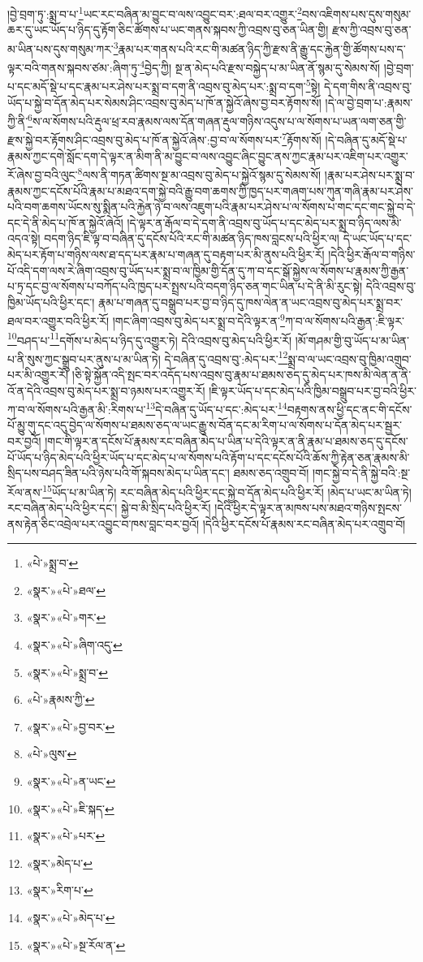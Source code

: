 །བྱེ་བྲག་ཏུ་:སྨྲ་བ་པ་\footnote{«པེ་»སྨྲ་བ་}ཡང་རང་བཞིན་མ་བྱུང་བ་ལས་འབྱུང་བར་:ཐལ་བར་འགྱུར་\footnote{«སྣར་»«པེ་»ཐལ་}བས་འཇིགས་པས་དུས་གསུམ་ཆར་དུ་ཡང་ཡོད་པ་ཉིད་དུ་རྟོག་ཅིང་ཚོགས་པ་ཡང་གནས་སྐབས་ཀྱི་འབྲས་བུ་ཅན་ཡིན་གྱི། རྫས་ཀྱི་འབྲས་བུ་ཅན་མ་ཡིན་པས་དུས་གསུམ་ཀར་\footnote{«སྣར་»«པེ་»གར་}རྣམ་པར་གནས་པའི་རང་གི་མཚན་ཉིད་ཀྱི་རྫས་ནི་རྒྱུ་དང་རྐྱེན་གྱི་ཚོགས་པས་ད་ལྟར་བའི་གནས་སྐབས་ཙམ་:ཞིག་ཏུ་\footnote{«སྣར་»«པེ་»ཞིག་འདུ་}བྱེད་ཀྱི། སྔ་ན་མེད་པའི་རྫས་བསྐྱེད་པ་མ་ཡིན་ནོ་སྙམ་དུ་སེམས་སོ། །བྱེ་བྲག་པ་དང་མདོ་སྡེ་པ་དང་རྣམ་པར་ཤེས་པར་སྨྲ་བ་དག་ནི་འབྲས་བུ་མེད་པར་:སྨྲ་བ་དག་\footnote{«སྣར་»«པེ་»སྨྲ་བ་}སྟེ། དེ་དག་གིས་ནི་འབྲས་བུ་ཡོད་པ་སྐྱེ་བ་དོན་མེད་པར་སེམས་ཤིང་འབྲས་བུ་མེད་པ་ཁོ་ན་སྐྱེའོ་ཞེས་བྱ་བར་རྟོགས་སོ། །དེ་ལ་བྱེ་བྲག་པ་:རྣམས་ཀྱི་ནི་\footnote{«པེ་»རྣམས་ཀྱི་}ས་ལ་སོགས་པའི་རྡུལ་ཕྲ་རབ་རྣམས་ལས་དོན་གཞན་རྡུལ་གཉིས་འདུས་པ་ལ་སོགས་པ་ཡན་ལག་ཅན་གྱི་རྫས་སྐྱེ་བར་རྟོགས་ཤིང་འབྲས་བུ་མེད་པ་ཁོ་ན་སྐྱེའོ་ཞེས་:བྱ་བ་ལ་སོགས་པར་\footnote{«སྣར་»«པེ་»བྱ་བར་}རྟོགས་སོ། །དེ་བཞིན་དུ་མདོ་སྡེ་པ་རྣམས་ཀྱང་དགེ་སློང་དག་དེ་ལྟར་ན་མིག་ནི་མ་བྱུང་བ་ལས་འབྱུང་ཞིང་བྱུང་ནས་ཀྱང་རྣམ་པར་འཇིག་པར་འགྱུར་རོ་ཞེས་བྱ་བའི་ལུང་\footnote{«པེ་»ལུས་}ལས་ནི་གཏན་ཚིགས་སྔ་མ་འབྲས་བུ་མེད་པ་སྐྱེའོ་སྙམ་དུ་སེམས་སོ། །རྣམ་པར་ཤེས་པར་སྨྲ་བ་རྣམས་ཀྱང་དངོས་པོའི་རྣམ་པ་མཐའ་དག་སྐྱེ་བའི་རྒྱུ་བག་ཆགས་ཀྱི་ཁྱད་པར་གཞག་པས་ཀུན་གཞི་རྣམ་པར་ཤེས་པའི་བག་ཆགས་ཡོངས་སུ་སྨིན་པའི་རྐྱེན་ཉེ་བ་ལས་འཇུག་པའི་རྣམ་པར་ཤེས་པ་ལ་སོགས་པ་གང་དང་གང་སྐྱེ་བ་དེ་དང་དེ་ནི་མེད་པ་ཁོ་ན་སྐྱེའོ་ཞེའོ། །དེ་ལྟར་ན་རྒོལ་བ་དེ་དག་ནི་འབྲས་བུ་ཡོད་པ་དང་མེད་པར་སྨྲ་བ་ཉིད་ལས་མི་འདའ་སྟེ། བདག་ཉིད་ཇི་ལྟ་བ་བཞིན་དུ་དངོས་པོའི་རང་གི་མཚན་ཉིད་ཁས་བླངས་པའི་ཕྱིར་ལ། དེ་ཡང་ཡོད་པ་དང་མེད་པར་རྟོག་པ་གཉིས་ལས་ཐ་དད་པར་རྣམ་པ་གཞན་དུ་བརྟག་པར་མི་ནུས་པའི་ཕྱིར་རོ། །དེའི་ཕྱིར་རྒོལ་བ་གཉིས་པོ་འདི་དག་ལས་རེ་ཞིག་འབྲས་བུ་ཡོད་པར་སྨྲ་བ་ལ་ཁྱིམ་གྱི་དོན་དུ་ཀ་བ་དང་སྒོ་སྐྱེས་ལ་སོགས་པ་རྣམས་ཀྱི་རྒྱན་པ་ཏྲ་དང་བྱ་ལ་སོགས་པ་བཀོད་པའི་ཁྱད་པར་སྤྲས་པའི་བདག་ཉིད་ཅན་གང་ཡིན་པ་དེ་ནི་མི་རུང་སྟེ། དེའི་འབྲས་བུ་ཁྱིམ་ཡོད་པའི་ཕྱིར་དང་། རྣམ་པ་གཞན་དུ་བསྒྲུབ་པར་བྱ་བ་ཉིད་དུ་ཁས་ལེན་ན་ཡང་འབྲས་བུ་མེད་པར་སྨྲ་བར་ཐལ་བར་འགྱུར་བའི་ཕྱིར་རོ། །གང་ཞིག་འབྲས་བུ་མེད་པར་སྨྲ་བ་དེའི་ལྟར་ན་\footnote{«སྣར་»«པེ་»ན་ཡང་}ཀ་བ་ལ་སོགས་པའི་རྒྱན་:ཇི་ལྟར་\footnote{«སྣར་»«པེ་»ཇི་སྐད་}བཤད་པ་\footnote{«སྣར་»«པེ་»པར་}དགོས་པ་མེད་པ་ཉིད་དུ་འགྱུར་ཏེ། དེའི་འབྲས་བུ་མེད་པའི་ཕྱིར་རོ། །མོ་གཤམ་གྱི་བུ་ཡོད་པ་མ་ཡིན་པ་ནི་སུས་ཀྱང་སྒྲུབ་པར་ནུས་པ་མ་ཡིན་ཏེ། དེ་བཞིན་དུ་འབྲས་བུ་:མེད་པར་\footnote{«སྣར་»མེད་པ་}སྨྲ་བ་ལ་ཡང་འབྲས་བུ་ཁྱིམ་འགྲུབ་པར་མི་འགྱུར་རོ། །ཅི་སྟེ་སྐྱོན་འདི་སྤང་བར་འདོད་པས་འབྲས་བུ་རྣམ་པ་ཐམས་ཅད་དུ་མེད་པར་ཁས་མི་ལེན་ན་ནི་འོ་ན་དེའི་འབྲས་བུ་མེད་པར་སྨྲ་བ་ཉམས་པར་འགྱུར་རོ། །ཇི་ལྟར་ཡོད་པ་དང་མེད་པའི་ཁྱིམ་བསྒྲུབ་པར་བྱ་བའི་ཕྱིར་ཀ་བ་ལ་སོགས་པའི་རྒྱན་མི་:རིགས་པ་\footnote{«སྣར་»རིག་པ་}དེ་བཞིན་དུ་ཡོད་པ་དང་:མེད་པར་\footnote{«སྣར་»«པེ་»མེད་པ་}བརྟགས་ནས་ཕྱི་དང་ནང་གི་དངོས་པོ་མྱུ་གུ་དང་འདུ་བྱེད་ལ་སོགས་པ་ཐམས་ཅད་ལ་ཡང་རྒྱུ་ས་བོན་དང་མ་རིག་པ་ལ་སོགས་པ་དོན་མེད་པར་སྦྱར་བར་བྱའོ། །གང་གི་ལྟར་ན་དངོས་པོ་རྣམས་རང་བཞིན་མེད་པ་ཡིན་པ་དེའི་ལྟར་ན་ནི་རྣམ་པ་ཐམས་ཅད་དུ་དངོས་པོ་ཡོད་པ་ཉིད་མེད་པའི་ཕྱིར་ཡོད་པ་དང་མེད་པ་ལ་སོགས་པའི་རྟོག་པ་དང་དངོས་པོའི་ཆོས་ཀྱི་རྟེན་ཅན་རྣམས་མི་སྲིད་པས་བཤད་ཟིན་པའི་ཉེས་པའི་གོ་སྐབས་མེད་པ་ཡིན་དང་། ཐམས་ཅད་འགྲུབ་བོ། །གང་སྐྱེ་བ་དེ་ནི་སྐྱེ་བའི་:སྔ་རོལ་ནས་\footnote{«སྣར་»«པེ་»སྔ་རོལ་ན་}ཡོད་པ་མ་ཡིན་ཏེ། རང་བཞིན་མེད་པའི་ཕྱིར་དང་སྐྱེ་བ་དོན་མེད་པའི་ཕྱིར་རོ། །མེད་པ་ཡང་མ་ཡིན་ཏེ། རང་བཞིན་མེད་པའི་ཕྱིར་དང་། སྐྱེ་བ་མི་སྲིད་པའི་ཕྱིར་རོ། །དེའི་ཕྱིར་དེ་ལྟར་ན་མཁས་པས་མཐའ་གཉིས་སྤངས་ནས་རྟེན་ཅིང་འབྲེལ་པར་འབྱུང་བ་ཁས་བླང་བར་བྱའོ། །དེའི་ཕྱིར་དངོས་པོ་རྣམས་རང་བཞིན་མེད་པར་འགྲུབ་བོ། 